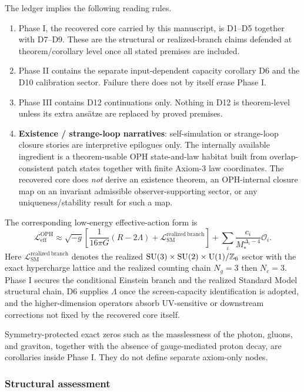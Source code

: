 The ledger implies the following reading rules.

\begin{enumerate}
\def\labelenumi{\arabic{enumi}.}
\item
Phase I, the recovered core carried by this manuscript, is D1--D5 together with D7--D9. These are the structural or realized-branch claims defended at theorem/corollary level once all stated premises are included.
\item
Phase II contains the separate input-dependent capacity corollary D6 and the D10 calibration sector. Failure there does not by itself erase Phase I.
\item
Phase III contains D12 continuations only. Nothing in D12 is theorem-level unless its extra ans\"atze are replaced by proved premises.
\item \textbf{Existence / strange-loop narratives}: self-simulation or strange-loop closure stories are interpretive epilogues only. The internally available ingredient is a theorem-usable OPH state-and-law habitat built from overlap-consistent patch states together with finite Axiom-3 law coordinates. The recovered core does \emph{not} derive an existence theorem, an OPH-internal closure map on an invariant admissible observer-supporting sector, or any uniqueness/stability result for such a map.
\end{enumerate}

The corresponding low-energy effective-action form is
\[
\mathcal L_{\mathrm{eff}}^{\mathrm{OPH}}
\approx
\sqrt{-g}\left[
\frac{1}{16\pi G}(R-2\Lambda)
+
\mathcal L_{\mathrm{SM}}^{\mathrm{realized\ branch}}
\right]
+
\sum_i \frac{c_i}{M_*^{\Delta_i-4}}\mathcal O_i.
\]
Here \(\mathcal L_{\mathrm{SM}}^{\mathrm{realized\ branch}}\) denotes the realized \(\mathrm{SU}(3)\times\mathrm{SU}(2)\times\mathrm{U}(1)/\mathbb Z_6\) sector with the exact hypercharge lattice and the realized counting chain \(N_g=3\) then \(N_c=3\). Phase I secures the conditional Einstein branch and the realized Standard Model structural chain, D6 supplies \(\Lambda\) once the screen-capacity identification is adopted, and the higher-dimension operators absorb UV-sensitive or downstream corrections not fixed by the recovered core itself.

Symmetry-protected exact zeros such as the masslessness of the photon, gluons, and graviton, together with the absence of gauge-mediated proton decay, are corollaries inside Phase I. They do not define separate axiom-only nodes.
\subsubsection{Structural assessment}\label{82-structural-assessment}

